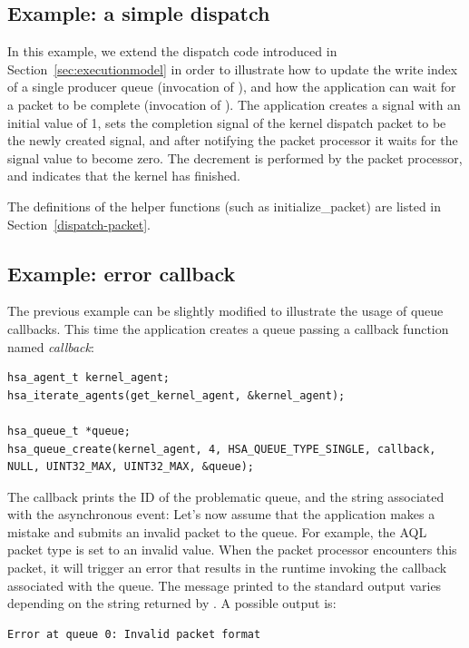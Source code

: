 \documentclass[final,oneside]{book}
\begin{document}
\subsection{Example: a simple dispatch}
In this example, we extend the dispatch code introduced in
Section~\ref{sec:executionmodel} in order to illustrate how to update the write
index of a single producer queue (invocation of
), and how the application can wait
for a packet to be complete (invocation of
). The application creates a signal with an
initial value of 1, sets the completion signal of the kernel dispatch packet to
be the newly created signal, and after notifying the packet processor it waits
for the signal value to become zero. The decrement is performed by the packet
processor, and indicates that the kernel has finished.


The definitions of the helper functions (such as initialize_packet) are listed
in Section~\ref{dispatch-packet}.

\subsection{Example: error callback}
The previous example can be slightly modified to illustrate the usage of queue
callbacks. This time the application creates a queue passing a callback function
named \emph{callback}:
\begin{lstlisting}
hsa_agent_t kernel_agent;
hsa_iterate_agents(get_kernel_agent, &kernel_agent);

hsa_queue_t *queue;
hsa_queue_create(kernel_agent, 4, HSA_QUEUE_TYPE_SINGLE, callback, NULL, UINT32_MAX, UINT32_MAX, &queue);
\end{lstlisting}

The callback prints the ID of the problematic queue, and the string associated
with the asynchronous event:
Let's now assume that the application makes a mistake and submits an invalid
packet to the queue. For example, the AQL packet type is set to an invalid
value. When the packet processor encounters this packet, it will trigger an
error that results in the runtime invoking the callback associated with the
queue. The message printed to the standard output varies depending on the string
returned by . A possible output is:
\begin{lstlisting}
Error at queue 0: Invalid packet format
\end{lstlisting}
\end{document}
